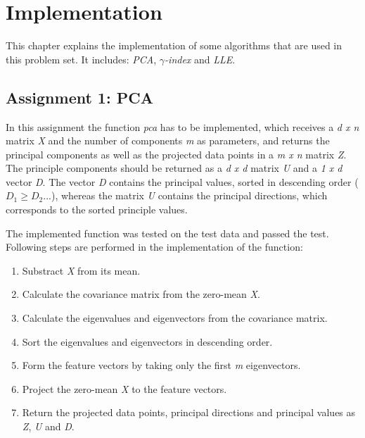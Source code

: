 \chapter{Implementation}
\label{implementation}

This chapter explains the implementation of some algorithms that are used in this problem set. It includes: \textit{PCA}, \textit{$\gamma$-index} and \textit{LLE}.

\section{Assignment 1: PCA}
\label{sec:assignment1}

In this assignment the function \textit{pca} has to be implemented, which receives a \textit{d x n} matrix \textit{X} and the number of components \textit{m} as parameters, and returns the principal components as well as the projected data points in a \textit{m x n} matrix \textit{Z}. The principle components should be returned as a \textit{d x d} matrix \textit{U} and a \textit{1 x d} vector \textit{D}. The vector \textit{D} contains the principal values, sorted in descending order ($D_1 \geq D_2 ...$), whereas the matrix \textit{U} contains the principal directions, which corresponds to the sorted principle values.

The implemented function was tested on the test data and passed the test. Following steps are performed in the implementation of the function:
\begin{enumerate}
	\item Substract \textit{X} from its mean.
	\item Calculate the covariance matrix from the zero-mean \textit{X}.
	\item Calculate the eigenvalues and eigenvectors from the covariance matrix.
	\item Sort the eigenvalues and eigenvectors in descending order.
	\item Form the feature vectors by taking only the first \textit{m} eigenvectors.
	\item Project the zero-mean \textit{X} to the feature vectors.
	\item Return the projected data points, principal directions and principal values as \textit{Z}, \textit{U} and \textit{D}.
\end{enumerate}

